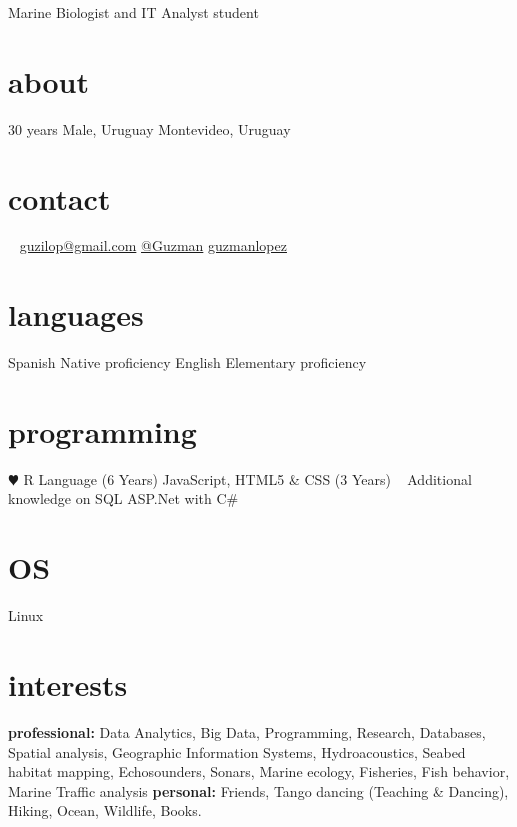 \documentclass[]{friggeri-cv} %
\begin{document}
{Marine Biologist and IT Analyst student} %


\begin{aside} %
	
\section{about}
30 years
Male, Uruguay
{\color{orange} \faHome{}} Montevideo, Uruguay
\section{contact}~
{\color{green} \faEnvelope{}} \href{mailto:guzilop@gmail.com}{guzilop@gmail.com}
{\color{blue} \faSend{}} \href{https://telegram.me/Guzman}{@Guzman}
\faGithubAlt{} \href{https://github.com/guzmanlopez}{guzmanlopez}
\section{languages}
Spanish Native proficiency
English Elementary proficiency
\section{programming}
{\color{red} $\varheartsuit$} R Language (6 Years)
JavaScript, HTML5 \& CSS (3 Years)
~
Additional knowledge
on SQL
ASP.Net with C\#
\section{OS}
{\color{gray}\FA \faLinux} Linux
\end{aside}

\section{interests}

\textbf{professional:} Data Analytics, Big Data, Programming, Research, Databases, Spatial analysis, Geographic Information Systems, Hydroacoustics, Seabed habitat mapping, Echosounders, Sonars, Marine ecology, Fisheries, Fish behavior, Marine Traffic analysis \textbf{personal:} Friends, Tango dancing (Teaching \& Dancing), Hiking, Ocean, Wildlife, Books.\\
\end{document}
